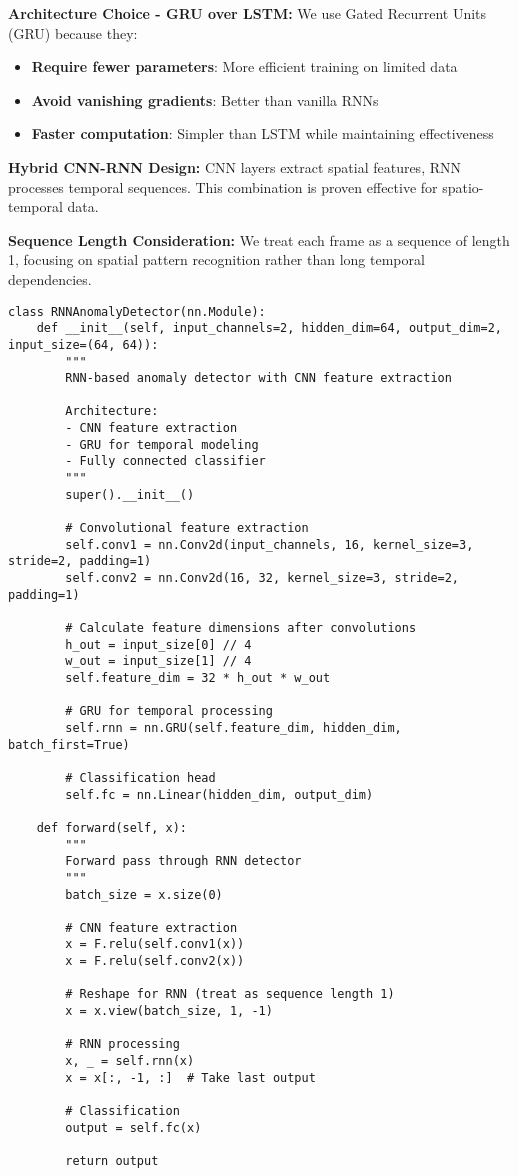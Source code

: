 \documentclass[12pt,a4paper]{article}
\begin{document}
\textbf{Architecture Choice - GRU over LSTM:} We use Gated Recurrent Units (GRU) because they:
\begin{itemize}
    \item \textbf{Require fewer parameters}: More efficient training on limited data
    \item \textbf{Avoid vanishing gradients}: Better than vanilla RNNs
    \item \textbf{Faster computation}: Simpler than LSTM while maintaining effectiveness
\end{itemize}

\textbf{Hybrid CNN-RNN Design:} CNN layers extract spatial features, RNN processes temporal sequences. This combination is proven effective for spatio-temporal data.

\textbf{Sequence Length Consideration:} We treat each frame as a sequence of length 1, focusing on spatial pattern recognition rather than long temporal dependencies.

\begin{lstlisting}[caption={RNN Anomaly Detector - Sequential Pattern Recognition}]
class RNNAnomalyDetector(nn.Module):
    def __init__(self, input_channels=2, hidden_dim=64, output_dim=2, input_size=(64, 64)):
        """
        RNN-based anomaly detector with CNN feature extraction
        
        Architecture:
        - CNN feature extraction
        - GRU for temporal modeling
        - Fully connected classifier
        """
        super().__init__()
        
        # Convolutional feature extraction
        self.conv1 = nn.Conv2d(input_channels, 16, kernel_size=3, stride=2, padding=1)
        self.conv2 = nn.Conv2d(16, 32, kernel_size=3, stride=2, padding=1)
        
        # Calculate feature dimensions after convolutions
        h_out = input_size[0] // 4
        w_out = input_size[1] // 4
        self.feature_dim = 32 * h_out * w_out
        
        # GRU for temporal processing
        self.rnn = nn.GRU(self.feature_dim, hidden_dim, batch_first=True)
        
        # Classification head
        self.fc = nn.Linear(hidden_dim, output_dim)
    
    def forward(self, x):
        """
        Forward pass through RNN detector
        """
        batch_size = x.size(0)
        
        # CNN feature extraction
        x = F.relu(self.conv1(x))
        x = F.relu(self.conv2(x))
        
        # Reshape for RNN (treat as sequence length 1)
        x = x.view(batch_size, 1, -1)
        
        # RNN processing
        x, _ = self.rnn(x)
        x = x[:, -1, :]  # Take last output
        
        # Classification
        output = self.fc(x)
        
        return output
\end{lstlisting}
\end{document}
